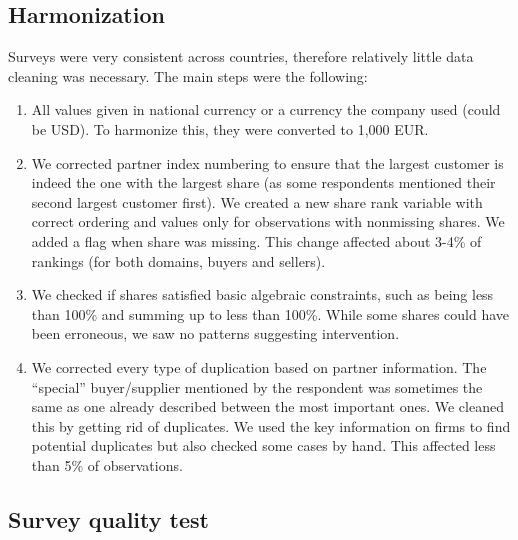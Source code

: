 \documentclass[final, dvipsnames, authoryear,12pt]{elsarticle}
\begin{document}
\subsection{Harmonization} 

Surveys were very consistent across countries, therefore relatively little data cleaning was necessary. The main steps were the following:

\begin{enumerate}
    \item All values given in national currency or a currency the company used (could be USD). To harmonize this, they were converted to 1,000 EUR. 
    
    \item We corrected partner index numbering to ensure that the largest customer is indeed the one with the largest share (as some respondents mentioned their second largest customer first). We created a new share rank variable with correct ordering and values only for observations with nonmissing shares. We added a flag when share was missing. This change affected about 3-4\% of rankings (for both domains, buyers and sellers). 
    
    \item We checked if shares satisfied basic algebraic constraints, such as being less than 100\% and summing up to less than 100\%. While some shares could have been erroneous, we saw no patterns suggesting intervention.
    
    \item We corrected every type of duplication based on partner information. The ``special'' buyer/supplier mentioned by the respondent was sometimes the same as one already described between the most important ones. We cleaned this by getting rid of duplicates. We used the key information on firms to find potential duplicates but also checked some cases by hand. This affected less than 5\% of observations.

\end{enumerate}

\subsection{Survey quality test}
\label{sec:quality_test}

\end{document}
